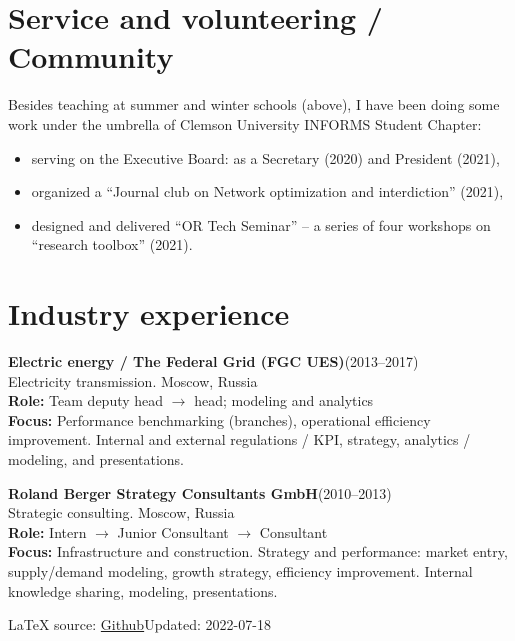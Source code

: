 \documentclass[11pt]{article} \usepackage{geometry} %
\newcommand{\jobl}[5]{%
  \textbf{#1}\hfill (#2)\\
  #3\vspace{0.25em}\\
  \textbf{Role:} #4\\
  \textbf{Focus:} #5}
\newcommand{\job}[5]{%
  \jobl{#1}{#2}{#3}{#4}{#5}\vspace{0.5em}
}
\begin{document}
   \section*{Service and volunteering / Community}
   Besides teaching at summer and winter schools (above), I have been doing some work under the umbrella of Clemson University INFORMS Student Chapter:
   \begin{itemize}
     \itemsep0pt
   \item serving on the Executive Board: as a Secretary (2020) and President
     (2021),
   \item organized a ``Journal club on Network optimization and interdiction''
     (2021),
   \item designed and delivered ``OR Tech Seminar'' -- a series of four
     workshops on ``research toolbox'' (2021). 
   \end{itemize}
   \vspace{0.3em}

   \section*{Industry experience}
   \job{Electric energy / The Federal Grid (FGC UES)}{2013--2017}{Electricity transmission.
     Moscow, Russia}{Team deputy head $\rightarrow$ head; modeling and analytics}{Performance
     benchmarking (branches), operational efficiency improvement. Internal
     and external regulations / KPI, strategy, analytics / modeling, and presentations.}

   \noindent
   \job{Roland Berger Strategy Consultants GmbH}{2010--2013}{Strategic consulting.
     Moscow, Russia}{ Intern $\rightarrow$ Junior
     Consultant $\rightarrow$ Consultant}{Infrastructure and construction.
     Strategy and performance: market entry, supply/demand modeling, growth
     strategy, efficiency improvement. Internal knowledge sharing, modeling, presentations.}
   {%
   \vfill\noindent\tiny\LaTeX{} source: \href{https://github.com/alex-bochkarev/AB-CV}{Github}\hfill  Updated: 2022-07-18}
\end{document}
